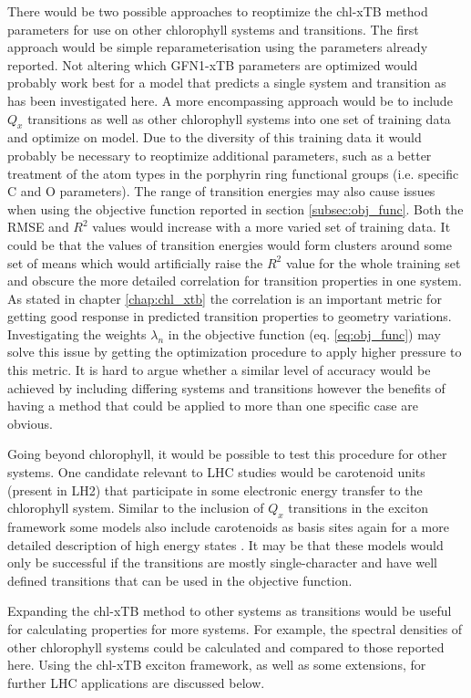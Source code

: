 There would be two possible approaches to reoptimize the chl-xTB method parameters 
for use on other chlorophyll systems and transitions. The first approach would be 
simple reparameterisation using the parameters already reported. Not altering which
GFN1-xTB parameters are optimized would probably work best for a model that predicts
a single system and transition as has been investigated here. A more encompassing 
approach would be to include $Q_x$ transitions as well as other chlorophyll systems
into one set of training data and optimize on model. Due to the diversity of this
training data it would probably be necessary to reoptimize additional parameters,
such as a better treatment of the atom types in the porphyrin ring functional groups 
(i.e. specific C and O parameters). The range of transition energies may also cause
issues when using the objective function reported in section \ref{subsec:obj_func}.
Both the RMSE and $R^2$ values would increase with a more varied set of training 
data. It could be that the values of transition energies would form clusters around
some set of means which would artificially raise the $R^2$ value for the whole training
set and obscure the more detailed correlation for transition properties in one system.
As stated in chapter \ref{chap:chl_xtb} the correlation is an important metric for
getting good response in predicted transition properties to geometry variations.
Investigating the weights $\lambda_n$ in the objective function (eq. \ref{eq:obj_func})
may solve this issue by getting the optimization procedure to apply higher pressure
to this metric. It is hard to argue whether a similar level of accuracy would be
achieved by including differing systems and transitions however the benefits of 
having a method that could be applied to more than one specific case are obvious.

Going beyond chlorophyll, it would be possible to test this procedure for other 
systems. One candidate relevant to LHC studies would be carotenoid units (present
in LH2) that participate in some electronic energy transfer to the chlorophyll system.
Similar to the inclusion of $Q_x$ transitions in the exciton framework some models
also include carotenoids as basis sites again for a more detailed description of
high energy states \cite{Polli2006, Andreussi2015}. It may be that these models 
would only be successful if the transitions are mostly single-character and have 
well defined transitions that can be used in the objective function. 

Expanding the chl-xTB method to other systems as transitions would be useful for
calculating properties for more systems. For example, the spectral densities of 
other chlorophyll systems could be calculated and compared to those reported here.
Using the chl-xTB exciton framework, as well as some extensions, for further LHC
applications are discussed below.

